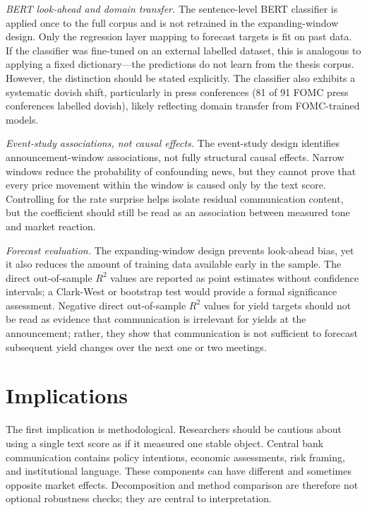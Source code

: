 \emph{BERT look-ahead and domain transfer.}
The sentence-level BERT classifier is applied once to the full corpus and is
not retrained in the expanding-window design. Only the regression layer mapping
\bertscore{} to forecast targets is fit on past data. If the classifier was
fine-tuned on an external labelled dataset, this is analogous to applying a
fixed dictionary---the predictions do not learn from the thesis corpus. However,
the distinction should be stated explicitly. The classifier also exhibits a
systematic dovish shift, particularly in press conferences (81 of 91 FOMC press
conferences labelled dovish), likely reflecting domain transfer from
FOMC-trained models.

\emph{Event-study associations, not causal effects.}
The event-study design identifies announcement-window associations, not fully
structural causal effects. Narrow windows reduce the probability of confounding
news, but they cannot prove that every price movement within the window is
caused only by the text score. Controlling for the rate surprise helps isolate
residual communication content, but the coefficient should still be read as an
association between measured tone and market reaction.

\emph{Forecast evaluation.}
The expanding-window design prevents look-ahead bias, yet it also reduces the
amount of training data available early in the sample. The direct out-of-sample
$R^2$ values are reported as point estimates without confidence intervals; a
Clark-West or bootstrap test would provide a formal significance assessment.
Negative direct out-of-sample $R^2$ values for yield targets should not be read
as evidence that communication is irrelevant for yields at the announcement;
rather, they show that communication is not sufficient to forecast subsequent
yield changes over the next one or two meetings.

\section{Implications}
\label{sec:disc_implications}

The first implication is methodological. Researchers should be cautious about
using a single text score as if it measured one stable object. Central bank
communication contains policy intentions, economic assessments, risk framing,
and institutional language. These components can have different and sometimes
opposite market effects. Decomposition and method comparison are therefore not
optional robustness checks; they are central to interpretation.

